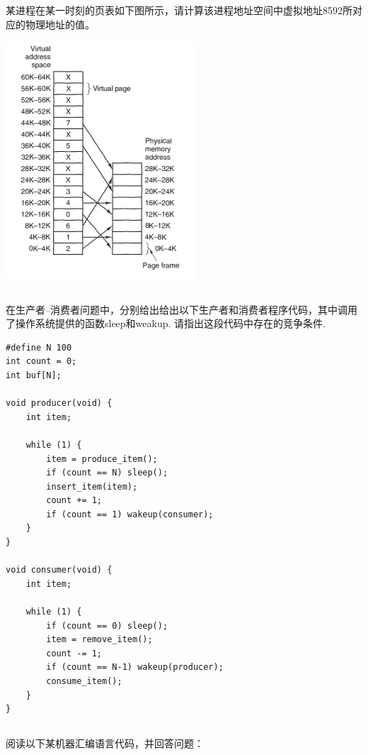 \documentclass[a4paper,11pt]{article}
\begin{document}
\begin{CJK*}{UTF8}{gbsn}
\subsection{}
某进程在某一时刻的页表如下图所示，请计算该进程地址空间中虚拟地址8592所对应的物理地址的值。

\includegraphics{vm.png}
\\[1in]

\newpage
\subsection{}
在生产者--消费者问题中，分别给出给出以下生产者和消费者程序代码，其中调用了操作系统提供的函数sleep和weakup.
请指出这段代码中存在的竞争条件.

%
\begin{verbatim}
#define N 100
int count = 0;
int buf[N];

void producer(void) {
    int item;

    while (1) {
        item = produce_item();
        if (count == N) sleep();
        insert_item(item);
        count += 1;
        if (count == 1) wakeup(consumer);
    }
}

void consumer(void) {
    int item;

    while (1) {
        if (count == 0) sleep();
        item = remove_item();
        count -= 1;
        if (count == N-1) wakeup(producer);
        consume_item();
    }
}
\end{verbatim}


\newpage
\subsection{}
阅读以下某机器汇编语言代码，并回答问题：


\end{CJK*}
\end{document}

